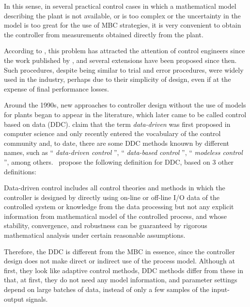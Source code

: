 In this sense, in several practical control cases in which a mathematical model describing the plant is not available, or is too complex or the uncertainty in the model is too great for the use of MBC strategies, it is very convenient to obtain the controller from measurements obtained directly from the plant.

According to \cite{campi2002}, this problem has attracted the attention of control engineers since the work published by \cite{ziegler1942}, and several extensions have been proposed since then.
Such procedures, despite being similar to trial and error procedures, were widely used in the industry, perhaps due to their simplicity of design, even if at the expense of final performance losses.

Around the 1990s, new approaches to controller design without the use of models for plants began to appear in the literature, which later came to be called control based on data (DDC).
%
\cite{hou2013} claim that the term \emph{data-driven} was first proposed in computer science and only recently entered the vocabulary of the control community and, to date, there are some DDC methods knouwn by different names, such as `` \emph{data-driven control} '', `` \emph{data-based control} '', `` \emph{modeless control} '', among others.~\cite{hou2013} propose the following definition for DDC, based on 3 other definitions:


\begin{defn}\citep{hou2013}
Data-driven control includes all control theories and methods in which the controller is designed by directly using on-line or off-line I/O data of the controlled system or knowledge from the data processing but not any explicit information from mathematical model of the controlled process, and whose stability, convergence, and robustness can be guaranteed by rigorous mathematical analysis under certain reasonable assumptions.
\end{defn}

Therefore, the DDC is different from the MBC in essence, since the controller design does not make direct or indirect use of the process model.  
Although at first, they look like adaptive control methods, DDC methods differ from these in that, at first, they do not need any model information, and parameter settings depend on large batches of data, instead of only a few samples of the input-output signals. %

